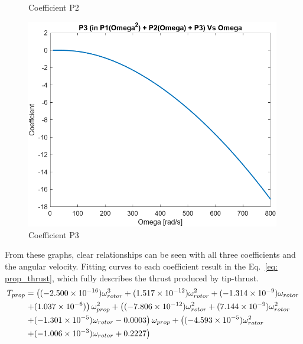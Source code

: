 \begin{figure}[h]
\begin{minipage}{0.31\textwidth}
                \caption{Coefficient P2}
                \label{fig: p2_coefficient}
            \end{minipage}\hfill
            \begin{minipage}{0.32\textwidth}
                \centering
                \includegraphics[width=0.99\textwidth]{figs/Model/Props/P3_Coeffcient.png}
                \caption{Coefficient P3}
                \label{fig: p3_coefficient}
            \end{minipage}
        \end{figure}
        From these graphs, clear relationships can be seen with all three coefficients and the angular velocity. Fitting curves to each coefficient result in the Eq.~\ref*{eq: prop_thrust}, which fully describes the thrust produced by tip-thrust.
        \begin{align}
            T_{prop}&=
            \left((-2.500\times 10^{-16})\omega_{rotor} ^3 + (1.517\times 10^{-12})\omega_{rotor} ^2 + (-1.314\times 10^{-9})\omega_{rotor} \right.\notag\\
            &\left. + (1.037\times 10^{-6})\right)\omega_{prop}^2 + \left((-7.806\times 10^{-12})\omega_{rotor}^2+(7.144\times 10^{-9})\omega_{rotor}^2 \right. \notag\\
            &\left. + (-1.301\times 10^{-5})\omega_{rotor}  -0.0003 \right)\omega_{prop}+\left( (-4.593\times 10^{-5})\omega_{rotor}^2 \right. \notag\\
            &\left.+ (-1.006\times 10^{-3})\omega_{rotor} +0.2227\right) \label{eq: prop_thrust}
        \end{align}

